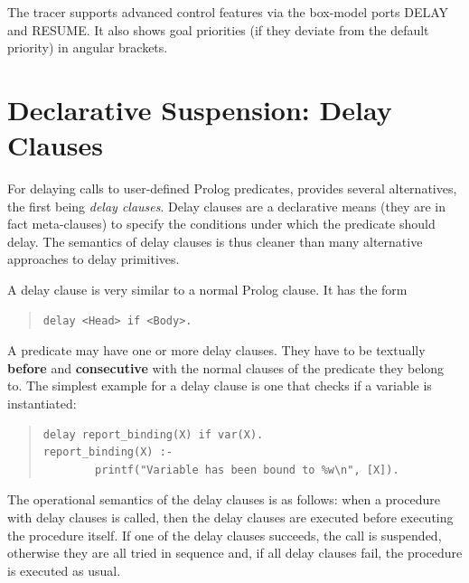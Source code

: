 The tracer supports advanced control features via
the box-model ports DELAY and RESUME.
It also shows goal priorities (if they deviate from the default priority)
in angular brackets.


\section{Declarative Suspension: Delay Clauses}

For delaying calls to user-defined Prolog predicates, {\eclipse}
 provides several alternatives, the first being {\it delay clauses}.
Delay clauses are a declarative means (they are in fact meta-clauses)
to specify the conditions under which the predicate should delay.
The semantics of delay clauses is thus cleaner than many alternative
approaches to delay primitives.

A delay clause is very similar to a normal Prolog clause. It has the form
\begin{quote}\begin{verbatim}
delay <Head> if <Body>.
\end{verbatim}\end{quote}
A predicate may have one or more delay clauses.
They have to be textually {\bf before} and {\bf consecutive}
with the normal clauses of the predicate they belong to.
The simplest example for a delay clause is one that checks if a variable
is instantiated:
\begin{quote}\begin{verbatim}
delay report_binding(X) if var(X).
report_binding(X) :-
        printf("Variable has been bound to %w\n", [X]).
\end{verbatim}\end{quote}

The operational semantics of the delay clauses is as follows:
when a procedure with delay clauses is called, then the delay
clauses are executed before executing the procedure itself.
If one of the delay clauses succeeds, the call is suspended,
otherwise they are all tried in sequence and,
if all delay clauses fail, the procedure is executed as usual.

